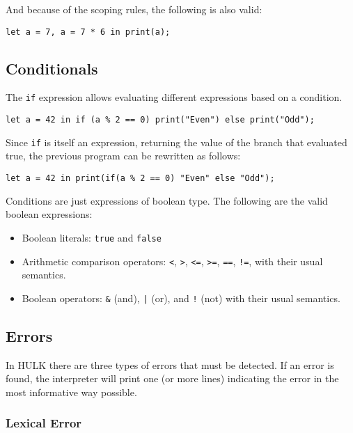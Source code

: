 \documentclass[a4paper, 12pt]{report}
\begin{document}
And because of the scoping rules, the following is also valid:

\begin{lstlisting}
let a = 7, a = 7 * 6 in print(a);
\end{lstlisting}

\subsection*{Conditionals}

The {\tt if} expression allows evaluating different expressions based on a condition. 

\begin{lstlisting}
let a = 42 in if (a % 2 == 0) print("Even") else print("Odd");
\end{lstlisting}

Since {\tt if} is itself an expression, returning the value of the branch that evaluated true,
the previous program can be rewritten as follows:

\begin{lstlisting}
let a = 42 in print(if(a % 2 == 0) "Even" else "Odd");
\end{lstlisting}

Conditions are just expressions of boolean type. The following are the valid boolean expressions:

\begin{itemize}
  \item Boolean literals: {\tt true} and {\tt false}
  \item Arithmetic comparison operators: {\tt <}, {\tt >}, {\tt <=}, {\tt >=}, {\tt ==}, {\tt !=}, with their usual semantics.
  \item Boolean operators: {\tt \&} (and), {\tt |} (or), and {\tt !} (not) with their usual semantics.
\end{itemize}

\subsection*{Errors}

In HULK there are three types of errors that must be detected. If an error is found, the interpreter will print one (or more lines) indicating
the error in the most informative way possible.

\subsubsection*{Lexical Error}
\end{document}

